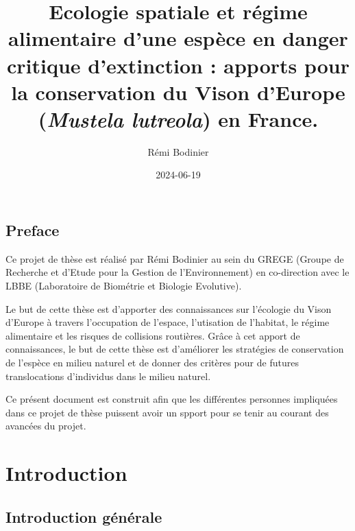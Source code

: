 \documentclass[
  letterpaper,
  DIV=11,
  numbers=noendperiod]{scrreprt}
\title{Ecologie spatiale et régime alimentaire d'une espèce en danger
critique d'extinction : apports pour la conservation du Vison d'Europe
(\emph{Mustela lutreola}) en France.}
\author{Rémi Bodinier}
\date{2024-06-19}
\renewcommand*\contentsname{Table of contents}
\newcommand\contentsname{Table of contents}
\begin{document}
\maketitle

\renewcommand*\contentsname{Table of contents}
{
\hypersetup{linkcolor=}
\setcounter{tocdepth}{2}
\tableofcontents
}

\chapter*{Preface}\label{preface}


Ce projet de thèse est réalisé par Rémi Bodinier au sein du GREGE
(Groupe de Recherche et d'Etude pour la Gestion de l'Environnement) en
co-direction avec le LBBE (Laboratoire de Biométrie et Biologie
Evolutive).

Le but de cette thèse est d'apporter des connaissances sur l'écologie du
Vison d'Europe à travers l'occupation de l'espace, l'utisation de
l'habitat, le régime alimentaire et les risques de collisions routières.
Grâce à cet apport de connaissances, le but de cette thèse est
d'améliorer les stratégies de conservation de l'espèce en milieu naturel
et de donner des critères pour de futures translocations d'individus
dans le milieu naturel.

Ce présent document est construit afin que les différentes personnes
impliquées dans ce projet de thèse puissent avoir un spport pour se
tenir au courant des avancées du projet.

\part{Introduction}

\chapter{Introduction générale}\label{introduction-guxe9nuxe9rale}
\end{document}
